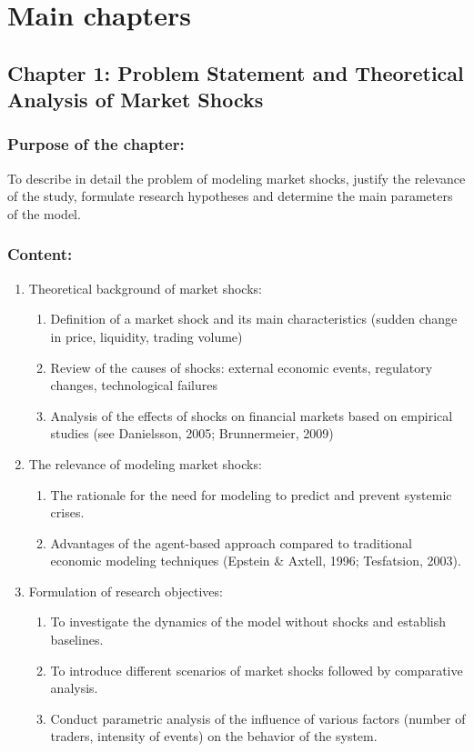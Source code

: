 \section{Main chapters}

\subsection{Chapter 1: Problem Statement and Theoretical Analysis of Market Shocks}

\subsubsection{Purpose of the chapter:}

To describe in detail the problem of modeling market shocks, justify the relevance of the study, formulate research hypotheses and determine the main parameters of the model.

\subsubsection{Content:}

\begin{enumerate}
    \item Theoretical background of market shocks:
    \begin{enumerate}
        \item Definition of a market shock and its main characteristics (sudden change in price, liquidity, trading volume)
        \item Review of the causes of shocks: external economic events, regulatory changes, technological failures
        \item Analysis of the effects of shocks on financial markets based on empirical studies (see Danielsson, 2005; Brunnermeier, 2009)
    \end{enumerate}
    \item The relevance of modeling market shocks:
    \begin{enumerate}
        \item The rationale for the need for modeling to predict and prevent systemic crises.
        \item Advantages of the agent-based approach compared to traditional economic modeling techniques (Epstein & Axtell, 1996; Tesfatsion, 2003).
    \end{enumerate}
    \item Formulation of research objectives:
    \begin{enumerate}
        \item To investigate the dynamics of the model without shocks and establish baselines.
        \item To introduce different scenarios of market shocks followed by comparative analysis.
        \item Conduct parametric analysis of the influence of various factors (number of traders, intensity of events) on the behavior of the system.
    \end{enumerate}
\end{enumerate}

